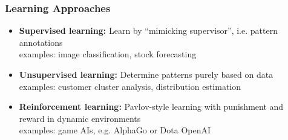 \documentclass[aspectratio=169]{beamer}
\begin{document}
\begin{frame}
\frametitle{Learning Approaches}
    \begin{itemize}
        \item \textbf{Supervised learning:} Learn by ``mimicking supervisor'', i.e. pattern annotations\\ 
        examples: image classification, stock forecasting
        \item \textbf{Unsupervised learning:} Determine patterns purely based on data\\ examples: customer cluster analysis, distribution estimation
        \item \textbf{Reinforcement learning:} Pavlov-style learning with punishment and reward in dynamic environments\\
        examples: game AIs, e.g. AlphaGo or Dota OpenAI
    \end{itemize}
\end{frame}
\end{document}
